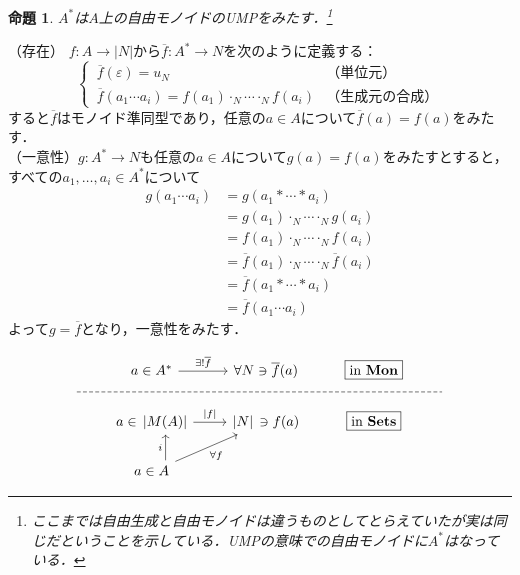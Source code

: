 \documentclass[dvipdfmx,a4j,10pt]{jsarticle}
\makeatletter
\theoremstyle{mystyle1}
\newtheorem{prop}[dfn]{命題}
\theoremstyle{mystyle2}
\renewenvironment{proof}[1][\proofname]{\par
  \pushQED{\qed}%
  \normalfont
  \topsep6\p@\@plus6\p@ \trivlist
  \item[\hskip\labelsep{\bfseries\sffamily #1}]\ignorespaces
}{%
  \popQED\endtrivlist\@endpefalse
}
\renewcommand\proofname{証明}
\newcommand{\Sets}{\mathbf{Sets}}
\newcommand{\Mon}{\mathbf{Mon}}
\makeatother
\begin{document}
\setcounter{dfn}{8}

\begin{prop}\label{prop:1-9}
	$A^*$は$A$上の自由モノイドのUMPをみたす．\footnote{ここまでは自由生成と自由モノイドは違うものとしてとらえていたが実は同じだということを示している．UMPの意味での自由モノイドに$A^*$はなっている．}
\end{prop}

\begin{proof}（存在）
	$f:A\to|N|$から$\overline{f}:A^*\to N$を次のように定義する：
	\[
		\begin{cases}
			\,\overline{f}(\varepsilon)=u_N                                   & （単位元）       \\
			\,\overline{f}(a_1\cdots a_i)=f(a_1)\cdot_N \cdots \cdot_N f(a_i) & （生成元の合成）
		\end{cases}
	\]
	すると$\overline{f}$はモノイド準同型であり，任意の$a\in A$について$\overline{f}(a)=f(a)$をみたす．\\
	（一意性）$g:A^*\to N$も任意の$a\in A$について$g(a)=f(a)$をみたすとすると，すべての$a_1,\ldots,a_i \in A^*$について
	\[
		\begin{split}
			g(a_1\cdots a_i) &= g(a_1 * \cdots * a_i) \\
			& = g(a_1)\cdot_N \cdots \cdot_N g(a_i)\\
			& = f(a_1)\cdot_N \cdots \cdot_N f(a_i)\\
			& = \overline{f}(a_1)\cdot_N \cdots \cdot_N \overline{f}(a_i) \\
			& = \overline{f}(a_1 * \cdots * a_i) \\
			& = \overline{f}(a_1 \cdots a_i)
		\end{split}
	\]
	よって$g=\overline{f}$となり，一意性をみたす．

	\begin{equation}
		\begin{tikzcd}
			& a \in A^* \arrow[r,"\exists !\overline{f}"] & \forall N \ni \overline{f}(a) & \fbox{in $\Mon$} & \\ [-3.2ex]
			|[alias=X]|\arrow[rrrr,dash,dashed,to=Y] & & & &|[alias=Y]| \\ [-3.2ex]
			& a \in \,{|M(A)|} \arrow[r,"|f|"] & {|N|} \,\ni f(a) & \fbox{in $\Sets$} & \\
			& a \in A \arrow[u,"i",xshift=1em] \arrow[ru,"\forall f"']
		\end{tikzcd}
	\end{equation}
\end{proof}
\end{document}
